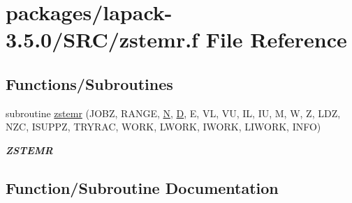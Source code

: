 \hypertarget{zstemr_8f}{}\section{packages/lapack-\/3.5.0/\+S\+R\+C/zstemr.f File Reference}
\label{zstemr_8f}
\subsection*{Functions/\+Subroutines}
\begin{DoxyCompactItemize}
\item 
subroutine \hyperlink{zstemr_8f_a33d197e0d2be9d9528f815c947c5fda1}{zstemr} (J\+O\+B\+Z, R\+A\+N\+G\+E, \hyperlink{polmisc_8c_a0240ac851181b84ac374872dc5434ee4}{N}, \hyperlink{odrpack_8h_a7dae6ea403d00f3687f24a874e67d139}{D}, E, V\+L, V\+U, I\+L, I\+U, M, W, Z, L\+D\+Z, N\+Z\+C, I\+S\+U\+P\+P\+Z, T\+R\+Y\+R\+A\+C, W\+O\+R\+K, L\+W\+O\+R\+K, I\+W\+O\+R\+K, L\+I\+W\+O\+R\+K, I\+N\+F\+O)
\begin{DoxyCompactList}\small\item\em {\bfseries Z\+S\+T\+E\+M\+R} \end{DoxyCompactList}\end{DoxyCompactItemize}


\subsection{Function/\+Subroutine Documentation}
\hypertarget{zstemr_8f_a33d197e0d2be9d9528f815c947c5fda1}{}
